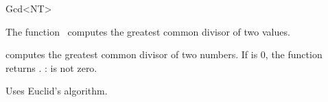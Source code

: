 \begin{ccRefFunctionObjectClass}{Gcd<NT>}

\ccDefinition

The function \ccRefName\ computes the greatest common divisor of two values.


\ccIsModel
{}

{
computes the greatest common divisor of two numbers. If  is
0, the function returns .
\ccPrecond:  is not zero.
}

\ccImplementation

Uses Euclid's algorithm.

\end{ccRefFunctionObjectClass}
